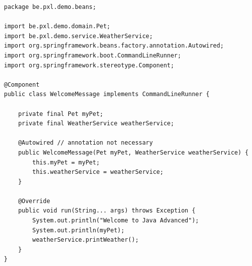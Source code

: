 \begin{lstlisting}
package be.pxl.demo.beans;

import be.pxl.demo.domain.Pet;
import be.pxl.demo.service.WeatherService;
import org.springframework.beans.factory.annotation.Autowired;
import org.springframework.boot.CommandLineRunner;
import org.springframework.stereotype.Component;

@Component
public class WelcomeMessage implements CommandLineRunner {

	private final Pet myPet;
	private final WeatherService weatherService;

	@Autowired // annotation not necessary
	public WelcomeMessage(Pet myPet, WeatherService weatherService) {
		this.myPet = myPet;
		this.weatherService = weatherService;
	}

	@Override
	public void run(String... args) throws Exception {
		System.out.println("Welcome to Java Advanced");
		System.out.println(myPet);
		weatherService.printWeather();
	}
}
\end{lstlisting}









